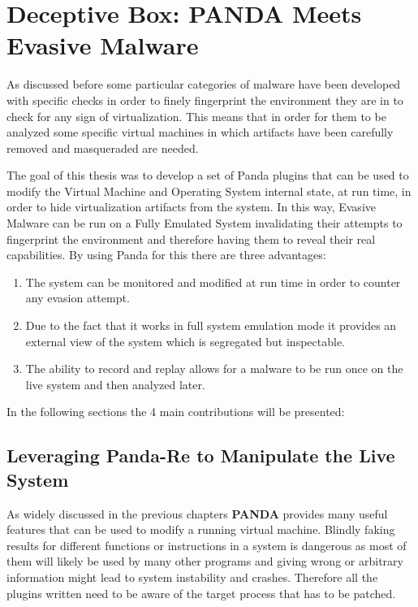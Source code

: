\chapter{Deceptive Box: PANDA Meets Evasive Malware}
\label{chap:5}

As discussed before some particular categories of malware have been developed with specific checks in order to finely fingerprint the environment they are in to check for any sign of virtualization. This means that in order for them to be analyzed some specific virtual machines in which artifacts have been carefully removed and masqueraded are needed.

The goal of this thesis was to develop a set of Panda plugins that can be used to modify the Virtual Machine and Operating System internal state, at run time, in order to hide virtualization artifacts from the system. In this way, Evasive Malware can be run on a Fully Emulated System invalidating their attempts to fingerprint the environment and therefore having them to reveal their real capabilities.
By using Panda for this there are three advantages: 
\begin{enumerate}
    \item The system can be monitored and modified at run time in order to counter any evasion attempt. 
    \item Due to the fact that it works in full system emulation mode it provides an external view of the system which is segregated but inspectable.
    \item The ability to record and replay allows for a malware to be run once on the live system and then analyzed later.
\end{enumerate}

In the following sections the 4 main contributions will be presented: 

\section{Leveraging Panda-Re to Manipulate the Live System}

As widely discussed in the previous chapters \textbf{PANDA} provides many useful features that can be used to modify a running virtual machine. Blindly faking results for different functions or instructions in a system is dangerous as most of them will likely be used by many other programs and giving wrong or arbitrary information might lead to system instability and crashes. Therefore all the plugins written need to be aware of the target process that has to be patched.

